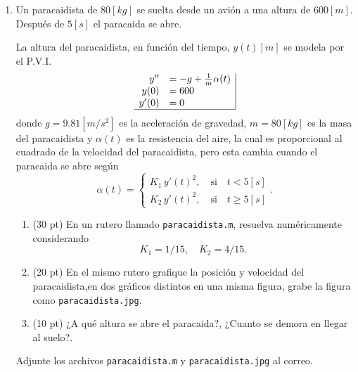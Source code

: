 \documentclass[11pt]{article}
\begin{document}
\begin{enumerate}
\item Un paracaidista de $80[kg]$ se suelta desde un avi\'on a una altura de $600[m]$. Despu\'es de $5[s]$ el paracaida se abre.

La altura del paracaidista, en funci\'on del tiempo, $y(t)[m]$ se modela por el P.V.I.
$$
\begin{array}{rl|}
y'' 	& = -g+\frac{1}{m}\alpha(t) \\
y(0)	& = 600\\
y'(0)	& = 0\\ \hline
\end{array}
$$
donde $g=9.81[m/s^2]$ es la aceleraci\'on de gravedad, $m=80[kg]$ es la masa del paracaidista y $\alpha(t)$ es la resistencia del aire, la cual es proporcional al cuadrado de la velocidad del paracaidista, pero esta cambia cuando el paracaida se abre seg\'un
$$
\alpha(t)=
\begin{cases}
K_1\, y'(t)^2 , \quad \text{si} \quad t<5[s]\\
K_2\, y'(t)^2 , \quad \text{si} \quad t\geq 5[s]
\end{cases}.
$$
\begin{enumerate}
\item(30 pt) En un rutero llamado \texttt{paracaidista.m}, resuelva num\'ericamente considerando 
$$
K_1=1/15, \quad K_2=4/15.
$$
\item (20 pt) En el mismo rutero grafique la posici\'on y velocidad del paracaidista,en dos gr\'aficos distintos en una misma figura, grabe la figura como \texttt{paracaidista.jpg}.
\item (10 pt) ¿A qu\'e altura se abre el paracaida?, ¿Cuanto se demora en llegar al suelo?.

\end{enumerate}
Adjunte los archivos \texttt{paracaidista.m} y \texttt{paracaidista.jpg} al correo.    


\end{enumerate}
\end{document}
